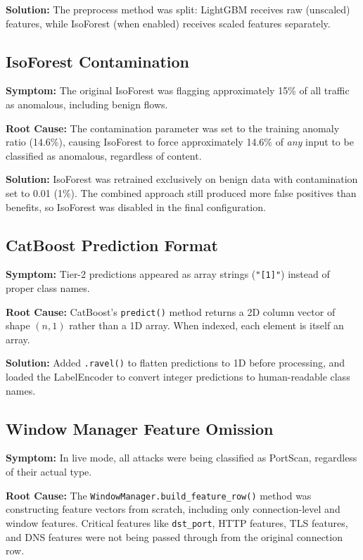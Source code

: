 \documentclass[12pt,a4paper,twoside]{report}
\begin{document}
\textbf{Solution:} The preprocess method was split: LightGBM receives raw (unscaled) features, while IsoForest (when enabled) receives scaled features separately.

\subsection{IsoForest Contamination}

\textbf{Symptom:} The original IsoForest was flagging approximately 15\% of all traffic as anomalous, including benign flows.

\textbf{Root Cause:} The contamination parameter was set to the training anomaly ratio (14.6\%), causing IsoForest to force approximately 14.6\% of \textit{any} input to be classified as anomalous, regardless of content.

\textbf{Solution:} IsoForest was retrained exclusively on benign data with contamination set to 0.01 (1\%). The combined approach still produced more false positives than benefits, so IsoForest was disabled in the final configuration.

\subsection{CatBoost Prediction Format}

\textbf{Symptom:} Tier-2 predictions appeared as array strings (\texttt{"[1]"}) instead of proper class names.

\textbf{Root Cause:} CatBoost's \texttt{predict()} method returns a 2D column vector of shape $(n, 1)$ rather than a 1D array. When indexed, each element is itself an array.

\textbf{Solution:} Added \texttt{.ravel()} to flatten predictions to 1D before processing, and loaded the LabelEncoder to convert integer predictions to human-readable class names.

\subsection{Window Manager Feature Omission}

\textbf{Symptom:} In live mode, all attacks were being classified as PortScan, regardless of their actual type.

\textbf{Root Cause:} The \texttt{WindowManager.build\_feature\_row()} method was constructing feature vectors from scratch, including only connection-level and window features. Critical features like \texttt{dst\_port}, HTTP features, TLS features, and DNS features were not being passed through from the original connection row.
\end{document}
